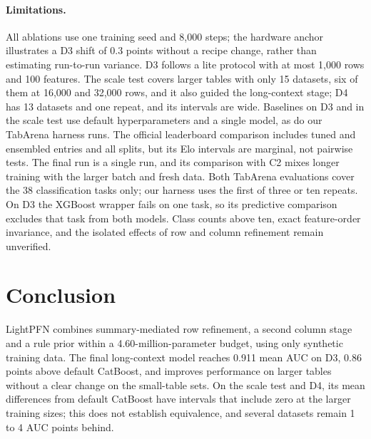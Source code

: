\documentclass[11pt]{article}
\begin{document}
\paragraph{Limitations.} All ablations use one training seed and 8,000 steps; the hardware anchor
illustrates a D3 shift of 0.3 points without a recipe change, rather than estimating run-to-run variance.
D3 follows a lite protocol
with at most 1,000 rows and 100 features. The scale test covers larger tables with only 15 datasets,
six of them at 16,000 and 32,000 rows, and it also guided the long-context stage; D4 has 13 datasets and one repeat,
and its intervals are wide. Baselines on D3 and
in the scale test use default hyperparameters and a single model, as do our TabArena harness runs. The
official leaderboard comparison includes tuned and ensembled entries and all splits, but its Elo intervals
are marginal, not pairwise tests. The final run is a single run, and its comparison with C2 mixes
longer training with the larger batch and fresh data. Both TabArena evaluations cover the 38 classification
tasks only; our harness uses the first of three or ten repeats. On
D3 the XGBoost wrapper fails on one task, so its predictive comparison excludes that task from both models. Class counts above ten, exact feature-order
invariance, and the isolated effects of row and column refinement remain unverified.

\section{Conclusion}

LightPFN combines summary-mediated row refinement, a second column stage and a rule prior within a
4.60-million-parameter budget, using only synthetic training data. The final long-context model reaches
0.911 mean AUC on D3, 0.86 points above default CatBoost, and improves performance on larger tables
without a clear change on the small-table sets. On the scale test and D4, its mean differences from
default CatBoost have intervals that include zero at the larger training sizes; this does not establish
equivalence, and several datasets remain 1 to 4 AUC points behind.
\end{document}
